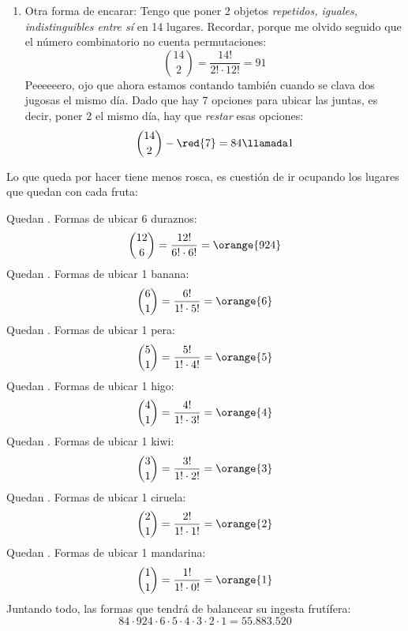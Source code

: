 \begin{enumerate}[label=\orange{\faIcon{lemon}$_\arabic*$)}]
  \item
        Otra forma de encarar: Tengo que poner 2 objetos \textit{repetidos, iguales, indistinguibles entre sí} en 14 lugares. Recordar, porque me olvido seguido que el número
        combinatorio no cuenta permutaciones:
        $$
          \binom{14}{2} = \frac{14!}{2! \cdot 12!} = 91
        $$
        Peeeeeero, ojo que ahora estamos contando también cuando \Pedro se clava dos jugosas  el mismo día. Dado que hay 7 opciones para ubicar
        las  juntas, es decir, poner 2  el mismo día, hay que \textit{restar} esas  opciones:
        $$
          \binom{14}{2} - \red{7} = 84 \llamada1
        $$
\end{enumerate}

Lo que queda por hacer tiene menos rosca, es cuestión de ir ocupando los lugares que quedan con cada fruta:

Quedan . Formas de ubicar 6 duraznos:
$$
  \binom{12}{6} = \frac{12!}{6! \cdot 6!} = \orange{924}
$$
Quedan . Formas de ubicar 1 banana:
$$
  \binom{6}{1} = \frac{6!}{1! \cdot 5!} = \orange{6}
$$
Quedan . Formas de ubicar 1 pera:
$$
  \binom{5}{1} = \frac{5!}{1! \cdot 4!} = \orange{5}
$$
Quedan . Formas de ubicar 1 higo:
$$
  \binom{4}{1} = \frac{4!}{1! \cdot 3!} = \orange{4}
$$
Quedan . Formas de ubicar 1 kiwi:
$$
  \binom{3}{1} = \frac{3!}{1! \cdot 2!} = \orange{3}
$$
Quedan . Formas de ubicar 1 ciruela:
$$
  \binom{2}{1} = \frac{2!}{1! \cdot 1!} = \orange{2}
$$
Quedan . Formas de ubicar 1 mandarina:
$$
  \binom{1}{1} = \frac{1!}{1! \cdot 0!} = \orange{1}
$$
Juntando todo, las formas que tendrá de balancear su ingesta frutífera:
$$
  84 \cdot 924 \cdot 6 \cdot 5 \cdot 4 \cdot 3 \cdot 2 \cdot 1 = 55.883.520
$$

\begin{aportes}
  \item {}
  \item {}

\end{aportes}
